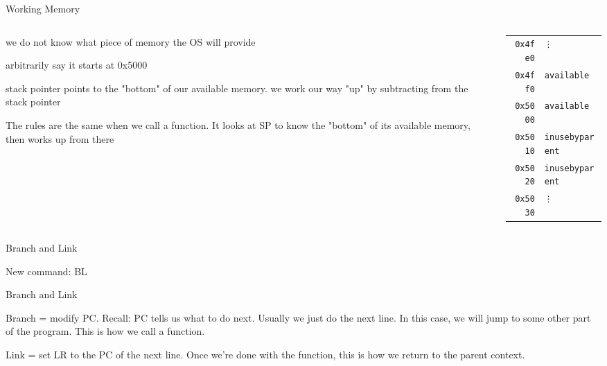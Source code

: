 \begin{frame}{Working Memory}
	\begin{columns}
		\begin{column}{0.5\textwidth}

			we do not know what piece of memory the OS will provide

			arbitrarily say it starts at 0x5000

			stack pointer points to the "bottom" of our available memory. we work our way "up" by subtracting from the stack pointer

			The rules are the same when we call a function. It looks at SP to know the "bottom" of its available memory, then works up from there

		\end{column}
		\begin{column}{0.5\textwidth}
			\begin{alltt}
				\begin{tabular}{ r | l }
					0x4fe0 & \vdots           \\
					0x4ff0 & available        \\
					0x5000 & available        \\
					0x5010 & in use by parent \\
					0x5020 & in use by parent \\
					0x5030 & \vdots           \\
				\end{tabular}
			\end{alltt}
		\end{column}
	\end{columns}

\end{frame}




\begin{frame}{Branch and Link}

	New command: BL

	Branch and Link

	Branch = modify PC. Recall: PC tells us what to do next. Usually we just do the next line. In this case, we will jump to some other part of the program. This is how we call a function.

	Link = set LR to the PC of the next line. Once we're done with the function, this is how we return to the parent context.

\end{frame}

